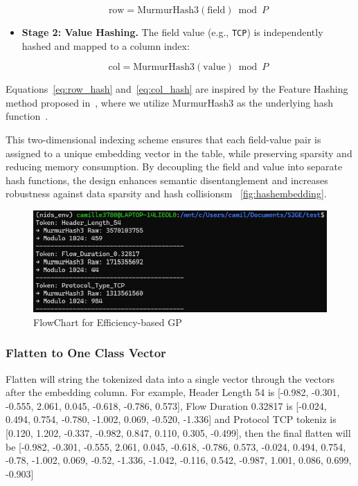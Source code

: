 \begin{ZhChapter}
\begin{itemize}
          \begin{equation}
              \text{row} = \text{MurmurHash3}(\text{field}) \bmod P
              \label{eq:row_hash}
          \end{equation}

    \item \textbf{Stage 2: Value Hashing.} The field value (e.g., \texttt{TCP}) is independently hashed and mapped to a column index:

          \begin{equation}
              \text{col} = \text{MurmurHash3}(\text{value}) \bmod P
              \label{eq:col_hash}
          \end{equation}
\end{itemize}

Equations~\eqref{eq:row_hash} and~\eqref{eq:col_hash} are inspired by the Feature Hashing method proposed in~\cite{weinberger2009feature}, where we utilize MurmurHash3 as the underlying hash function~\cite{appleby2011murmurhash}.


This two-dimensional indexing scheme ensures that each field-value pair is assigned to a unique embedding vector in the table, while preserving sparsity and reducing memory consumption. By decoupling the field and value into separate hash functions, the design enhances semantic disentanglement and increases robustness against data sparsity and hash collisionsm ~\ref{fig:hashembedding}.


\begin{figure}[htbp]
    \centering
    \includegraphics[width = 1\textwidth]{image/2025-06-30 002218.jpg}
    \caption{FlowChart for Efficiency-based GP}
    \label{fig: hashembedding}
\end{figure}




\subsubsection{Flatten to One Class Vector}
Flatten will string the tokenized data into a single vector through the vectors after the embedding column. For example, Header Length 54 is [-0.982, -0.301, -0.555,  2.061,  0.045, -0.618, -0.786,  0.573], Flow Duration 0.32817 is [-0.024,  0.494,  0.754, -0.780, -1.002,  0.069, -0.520, -1.336] and Protocol TCP tokeniz is [0.120,  1.202, -0.337, -0.982,  0.847,  0.110,  0.305, -0.499], then the final flatten will be [-0.982, -0.301, -0.555, 2.061, 0.045, -0.618, -0.786, 0.573, -0.024, 0.494, 0.754, -0.78, -1.002, 0.069, -0.52, -1.336, -1.042, -0.116, 0.542, -0.987, 1.001, 0.086, 0.699, -0.903]



\end{ZhChapter}
